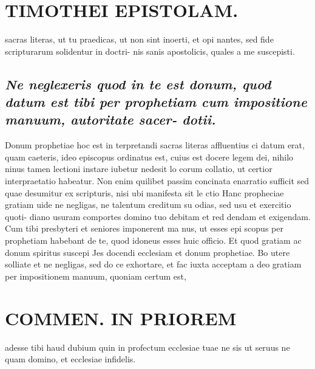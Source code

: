 \documentclass{article}
\begin{document}
\begin{pages}
\section*{TIMOTHEI EPISTOLAM. }
\marginpar{[ p.111 ]}\pstart sacras literas, ut tu praedicas, ut non sint inoerti, et opi nantes, sed fide scripturarum solidentur in doctri- nis sanis apostolicis, quales a me suscepisti.  \pend
{}
{}
\subsection*{\textit{Ne neglexeris quod in te est donum, quod datum est tibi per prophetiam cum impositione manuum, autoritate sacer- dotii. }}\pstart Donum prophetiae hoc est in terpretandi sacras literas affluentius ci datum erat, quam caeteris, ideo episcopus ordinatus est, cuius est docere legem dei, nihilo ninus tamen lectioni instare iubetur nedesit lo corum collatio, ut certior interpraetatio habeatur. Non enim quilibet passim concinata enarratio sufficit sed quae desumitur ex scripturis, nisi ubi manifesta sit le ctio Hanc propheciae gratiam uide ne negligas, ne talentum creditum su odias, sed usu et exercitio quoti- diano usuram comportes domino tuo debitam et red dendam et exigendam.  \pend\pstart Cum tibi presbyteri et seniores imponerent ma nus, ut esses epi scopus per prophetiam habebant de te, quod idoneus esses huic officio. Et quod gratiam ac donum spiritus suscepi Jes docendi ecclesiam et donum prophetiae. Bo utere solliate et ne negligas, sed do ce exhortare, et fac iuxta acceptam a deo gratiam per impositionem manuum, quoniam certum est,  \pend
\section*{COMMEN. IN PRIOREM }
\marginpar{[ p.112 ]}\pstart adesse tibi haud dubium quin in profectum ecclesiae tuae ne sis ut seruus ne quam domino, et ecclesiae infidelis.  \pend
{}
{}

\end{pages}
\end{document}
